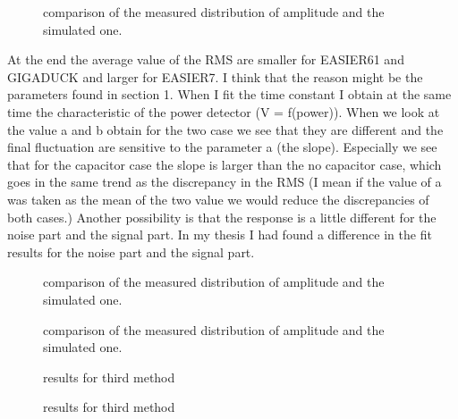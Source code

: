 \begin{figure}[!ht]
  \centering
  \hspace*{-3ex}
  \caption{comparison of the measured distribution of amplitude and the simulated one.}
  \label{fig:datatrace}
\end{figure}

At the end  the average value of the RMS are  smaller for EASIER61 and
GIGADUCK and larger for EASIER7. I  think that the reason might be the
parameters found in  section 1. When I fit the  time constant I obtain
at  the  same time  the  characteristic of  the  power  detector (V  =
f(power)). When we look  at the value a and b obtain  for the two case
we see that they are different and the final fluctuation are sensitive
to  the parameter  a  (the slope).   Especially  we see  that for  the
capacitor case the  slope is larger than the  no capacitor case, which
goes in the  same trend as the  discrepancy in the RMS (I  mean if the
value of a was taken as the  mean of the two value we would reduce the
discrepancies of both cases.) Another possibility is that the response
is a  little different for the noise  part and the signal  part. In my
thesis I had found a difference  in the fit results for the noise part
and the signal part. 
 


\begin{figure}[!ht]
  \centering
  \hspace*{-3ex}
  \caption{comparison of the measured distribution of amplitude and the simulated one.}
  \label{fig:m2_distdata}
\end{figure}

\begin{figure}[!ht]
  \centering
  \hspace*{-3ex}
  \caption{comparison of the measured distribution of amplitude and the simulated one.}
  \label{fig:m2_comprms}
\end{figure}


\begin{figure}[!ht]
  \centering
  \hspace*{-3ex}
  \caption{results for third method}
  \label{fig:m3_distdata}
\end{figure}

\begin{figure}[!ht]
  \centering
  \hspace*{-3ex}
  \caption{results for third method}
  \label{fig:m3_comprms}
\end{figure}




